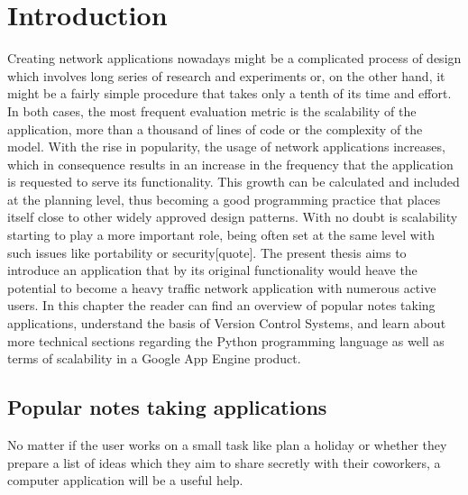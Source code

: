 \chapter{Introduction}
\label{sec:Introduction}
Creating network applications nowadays might be a complicated process of design which involves long series of research and experiments or, on the other hand, it might be a fairly simple procedure that takes only a tenth of its time and effort. In both cases, the most frequent evaluation metric is the scalability of the application, more than a thousand of lines of code or the complexity of the model. With the rise in popularity, the usage of network applications increases, which in consequence results in an increase in the frequency that the application is requested to serve its functionality. This growth can be calculated and included at the planning level, thus becoming a good programming practice that places itself close to other widely approved design patterns. With no doubt is scalability starting to play a more important role, being often set at the same level with such issues like portability or security[quote]. The present thesis aims to introduce an application that by its original functionality would heave the potential to become a heavy traffic network application with numerous active users. In this chapter the reader can find an overview of popular notes taking applications, understand the basis of Version Control Systems, and learn about more technical sections regarding the Python programming language as well as terms of scalability in a Google App Engine product.

\section{Popular notes taking applications}\label{sec:popular_apps} 
No matter if the user works on a small task like plan a holiday or whether they prepare a list of ideas which they aim to share secretly with their coworkers, a computer application will be a useful help.     


